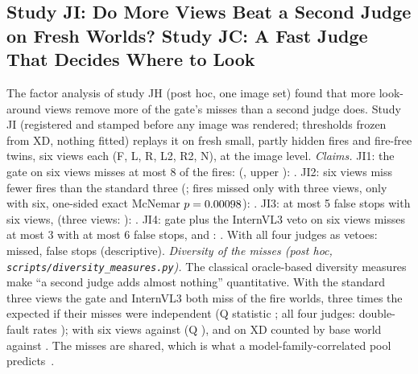 \subsection{Study JI: Do More Views Beat a Second Judge on Fresh Worlds? Study JC: A Fast Judge That Decides Where to Look}\label{sec:moved-ji}
The factor analysis of study JH (post hoc, one image set) found that more look-around views remove more of the gate's misses than a second judge does. Study JI (registered and stamped before any image was rendered; thresholds frozen from XD, nothing fitted) replays it on \JIFire{} fresh small, partly hidden fires and \JIClean{} fire-free twins, six views each (F, L, R, L2, R2, N), at the image level.
\emph{Claims.} JI1: the gate on six views misses at most 8 of the fires: \JISix{} (\JISixRate, upper \JISixUpper): \JIOneHolds. JI2: six views miss fewer fires than the standard three (\JIThree{}; \JIOnlyThree{} fires missed only with three views, \JIOnlySix{} only with six, one-sided exact McNemar $p=0.00098$): \JITwoHolds. JI3: at most 5 false stops with six views, \JISixFS{} (three views: \JIThreeFS): \JIThreeHolds. JI4: gate plus the InternVL3 veto on six views misses at most 3 with at most 6 false stops, \JIVetoMiss{} and \JIVetoFS: \JIFourHolds. With all four judges as vetoes: \JIAllMiss{} missed, \JIAllFS{} false stops (descriptive).
 \emph{Diversity of the misses (post hoc, \texttt{scripts/diversity\_measures.py}).} The classical oracle-based diversity measures make ``a second judge adds almost nothing'' quantitative. With the standard three views the gate and InternVL3 both miss \DivJIThreeDF{} of the \DivJIThreeClusters{} fire worlds, three times the \DivJIThreeInd{} expected if their misses were independent (Q statistic \DivJIThreeQ; all four judges: double-fault rates \DivJIThreeAll); with six views \DivJISixDF{} against \DivJISixInd{} (Q \DivJISixQ), and on XD counted by base world \DivXDThreeDF{} against \DivXDThreeInd{}. The misses are shared, which is what a model-family-correlated pool predicts~\cite{bugaud2026hiddenclones,kohli2026ninejudges}.
